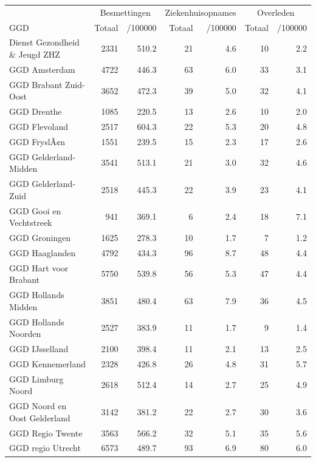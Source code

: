 \documentclass[
  english,
  man,floatsintext]{apa6}
\begin{document}
\begin{table}[H]
\centering\begingroup\fontsize{10}{12}\selectfont

\begin{threeparttable}
\begin{tabular}{lrrrrrr}
\toprule
\multicolumn{1}{c}{ } & \multicolumn{2}{c}{Besmettingen} & \multicolumn{2}{c}{Ziekenhuisopnames} & \multicolumn{2}{c}{Overleden} \\
\cmidrule(l{3pt}r{3pt}){2-3} \cmidrule(l{3pt}r{3pt}){4-5} \cmidrule(l{3pt}r{3pt}){6-7}
GGD & Totaal & /100000 & Totaal & /100000 & Totaal & /100000\\
\midrule
Dienst Gezondheid \& Jeugd ZHZ & 2331 & 510.2 & 21 & 4.6 & 10 & 2.2\\
GGD Amsterdam & 4722 & 446.3 & 63 & 6.0 & 33 & 3.1\\
GGD Brabant Zuid-Oost & 3652 & 472.3 & 39 & 5.0 & 32 & 4.1\\
GGD Drenthe & 1085 & 220.5 & 13 & 2.6 & 10 & 2.0\\
GGD Flevoland & 2517 & 604.3 & 22 & 5.3 & 20 & 4.8\\
GGD FryslÃ¢n & 1551 & 239.5 & 15 & 2.3 & 17 & 2.6\\
GGD Gelderland-Midden & 3541 & 513.1 & 21 & 3.0 & 32 & 4.6\\
GGD Gelderland-Zuid & 2518 & 445.3 & 22 & 3.9 & 23 & 4.1\\
GGD Gooi en Vechtstreek & 941 & 369.1 & 6 & 2.4 & 18 & 7.1\\
GGD Groningen & 1625 & 278.3 & 10 & 1.7 & 7 & 1.2\\
GGD Haaglanden & 4792 & 434.3 & 96 & 8.7 & 48 & 4.4\\
GGD Hart voor Brabant & 5750 & 539.8 & 56 & 5.3 & 47 & 4.4\\
GGD Hollands Midden & 3851 & 480.4 & 63 & 7.9 & 36 & 4.5\\
GGD Hollands Noorden & 2527 & 383.9 & 11 & 1.7 & 9 & 1.4\\
GGD IJsselland & 2100 & 398.4 & 11 & 2.1 & 13 & 2.5\\
GGD Kennemerland & 2328 & 426.8 & 26 & 4.8 & 31 & 5.7\\
GGD Limburg Noord & 2618 & 512.4 & 14 & 2.7 & 25 & 4.9\\
GGD Noord en Oost Gelderland & 3142 & 381.2 & 22 & 2.7 & 30 & 3.6\\
GGD Regio Twente & 3563 & 566.2 & 32 & 5.1 & 35 & 5.6\\
GGD regio Utrecht & 6573 & 489.7 & 93 & 6.9 & 80 & 6.0\\

\end{tabular}
\end{threeparttable}
\end{table}
\end{document}
